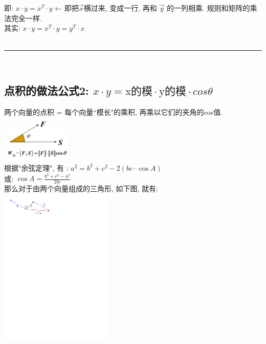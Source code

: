 \documentclass[UTF8]{ctexart}
\begin{document}
即:   $x\cdot y = x^T \cdot y$  ← 即把$\vec{x}$横过来, 变成一行, 再和 $\vec{y}$ 的一列相乘. 规则和矩阵的乘法完全一样.\\
其实:   $x\cdot y = x^T \cdot y = y^T  \cdot x$\\

~\\
\hrule
~\\


\subsection{点积的做法公式2: $x \cdot y = \text{x的模} \cdot \text{y的模} \cdot cos \theta$}

两个向量的点积 = 每个向量``模长"的乘积, 再乘以它们的夹角的cos值. \\
\includegraphics[width=0.25\textwidth]{img/0095.png}\\

根据"余弦定理", 有 : $a^2 = b^2 + c^2 - 2(bc \cdot \cos A) $\\
或: $\cos A = \frac{b^2 + c^2 - a^2} {2bc}$\\

那么对于由两个向量组成的三角形, 如下图, 就有: \\
\includegraphics[width=0.4\textwidth]{img/0096.pdf}
\end{document}
